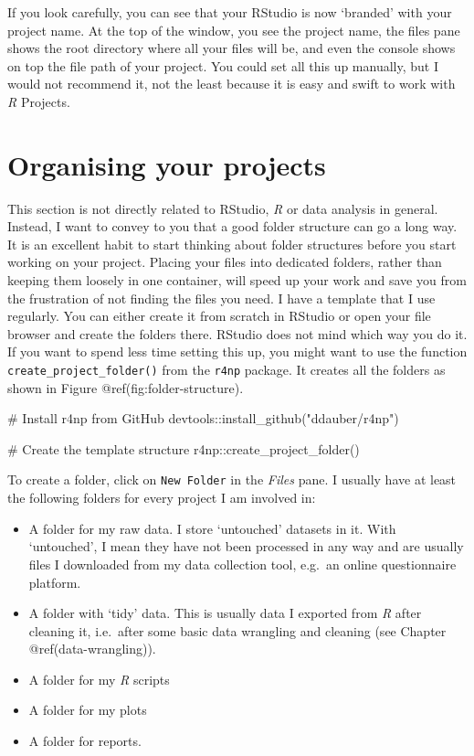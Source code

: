 \documentclass[
  letterpaper,
]{krantz}
\makeatletter
\newenvironment{Shaded}{\begin{snugshade}}{\end{snugshade}}
\newcommand{\CommentTok}[1]{\textcolor[rgb]{0.37,0.37,0.37}{#1}}
\newcommand{\FunctionTok}[1]{\textcolor[rgb]{0.28,0.35,0.67}{#1}}
\newcommand{\NormalTok}[1]{\textcolor[rgb]{0.00,0.23,0.31}{#1}}
\newcommand{\SpecialCharTok}[1]{\textcolor[rgb]{0.37,0.37,0.37}{#1}}
\newcommand{\StringTok}[1]{\textcolor[rgb]{0.13,0.47,0.30}{#1}}
\newenvironment{kframe}{%
\medskip{}
\setlength{\fboxsep}{.8em}
 \def\at@end@of@kframe{}%
 \ifinner\ifhmode%
  \def\at@end@of@kframe{\end{minipage}}%
  \begin{minipage}{\columnwidth}%
 \fi\fi%
 \def\FrameCommand##1{\hskip\@totalleftmargin \hskip-\fboxsep
 \colorbox{shadecolor}{##1}\hskip-\fboxsep
     \hskip-\linewidth \hskip-\@totalleftmargin \hskip\columnwidth}%
 \MakeFramed {\advance\hsize-\width
   \@totalleftmargin\z@ \linewidth\hsize
   \@setminipage}}%
 {\par\unskip\endMakeFramed%
 \at@end@of@kframe}
\renewenvironment{Shaded}{\begin{kframe}}{\end{kframe}}
\makeatother
\begin{document}
If you look carefully, you can see that your RStudio is now `branded'
with your project name. At the top of the window, you see the project
name, the files pane shows the root directory where all your files will
be, and even the console shows on top the file path of your project. You
could set all this up manually, but I would not recommend it, not the
least because it is easy and swift to work with \emph{R} Projects.

\section{Organising your projects}\label{sec-organising-your-projects}

This section is not directly related to RStudio, \emph{R} or data
analysis in general. Instead, I want to convey to you that a good folder
structure can go a long way. It is an excellent habit to start thinking
about folder structures before you start working on your project.
Placing your files into dedicated folders, rather than keeping them
loosely in one container, will speed up your work and save you from the
frustration of not finding the files you need. I have a template that I
use regularly. You can either create it from scratch in RStudio or open
your file browser and create the folders there. RStudio does not mind
which way you do it. If you want to spend less time setting this up, you
might want to use the function \texttt{create\_project\_folder()} from
the \texttt{r4np} package. It creates all the folders as shown in Figure
@ref(fig:folder-structure).

\begin{Shaded}
\begin{Highlighting}[]
\CommentTok{\# Install \textquotesingle{}r4np\textquotesingle{} from GitHub}
\NormalTok{devtools}\SpecialCharTok{::}\FunctionTok{install\_github}\NormalTok{(}\StringTok{"ddauber/r4np"}\NormalTok{)}

\CommentTok{\# Create the template structure}
\NormalTok{r4np}\SpecialCharTok{::}\FunctionTok{create\_project\_folder}\NormalTok{()}
\end{Highlighting}
\end{Shaded}

To create a folder, click on \texttt{New\ Folder} in the \emph{Files}
pane. I usually have at least the following folders for every project I
am involved in:

\begin{itemize}
\item
  A folder for my raw data. I store `untouched' datasets in it. With
  `untouched', I mean they have not been processed in any way and are
  usually files I downloaded from my data collection tool, e.g.~an
  online questionnaire platform.
\item
  A folder with `tidy' data. This is usually data I exported from
  \emph{R} after cleaning it, i.e.~after some basic data wrangling and
  cleaning (see Chapter @ref(data-wrangling)).
\item
  A folder for my \emph{R} scripts
\item
  A folder for my plots
\item
  A folder for reports.
\end{itemize}
\end{document}
